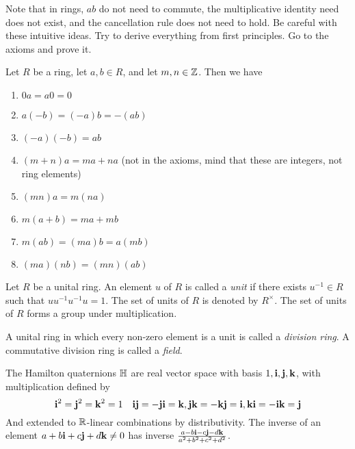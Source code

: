 \begin{remark}
  Note that in rings, $ab$ do not need to commute, the multiplicative identity need does
  not exist, and the cancellation rule does not need to hold. Be careful with these
  intuitive ideas. Try to derive everything from first principles. Go to the axioms and
  prove it.
\end{remark}


\begin{theorem}
  Let $R$ be a ring, let $a,b\in R$, and let $m,n\in\mathbb Z$. Then we have 
  \begin{enumerate}
    \item $0a = a0 =0$
    \item $a(-b)=(-a)b=-(ab)$
    \item $(-a)(-b)=ab$
    \item $(m+n)a = ma+na$ (not in the axioms, mind that these are integers, not ring
      elements)
    \item $(mn)a=m(na)$
    \item $m(a+b)=ma+mb$
    \item $m(ab)=(ma)b = a(mb)$
    \item $(ma)(nb)=(mn)(ab)$
  \end{enumerate}
  \label{<+label+>}
\end{theorem}

\begin{definition}
  Let $R$ be a unital ring. An element $u$ of $R$ is called a \emph{unit} if there exists
  $u^{-1}\in R$ such that $uu^{-1}u^{-1}u=1$. The set of units of $R$ is denoted by
  $R^{\times}$. The set of units of $R$ forms a group under multiplication.
  \label{<+label+>}
\end{definition}

\begin{definition}
  A unital ring in which every non-zero element is a unit is called a \emph{division
  ring}. A commutative division ring is called a \emph{field}.
  \label{<+label+>}
\end{definition}

\begin{example}
  The Hamilton quaternions $\mathbb H$ are real vector space with basis $1, \mathbf i, \mathbf j, \mathbf k$, with
  multiplication defined by 
  \[\mathbf i^2=\mathbf j^2=\mathbf k^2=1 \quad \mathbf i\mathbf j=-\mathbf j\mathbf i=\mathbf k, \mathbf j\mathbf k=-\mathbf k\mathbf j=\mathbf i, \mathbf k\mathbf i=-\mathbf i\mathbf k=\mathbf j\]
  And extended to $\mathbb R$-linear combinations by distributivity. The inverse of an element
  $a+b\mathbf i+c\mathbf j+d\mathbf k \neq 0$ has inverse $\frac{a-b\mathbf i-c\mathbf j-d\mathbf k}{a^2+b^2+c^2+d^2}$.
\end{example}

